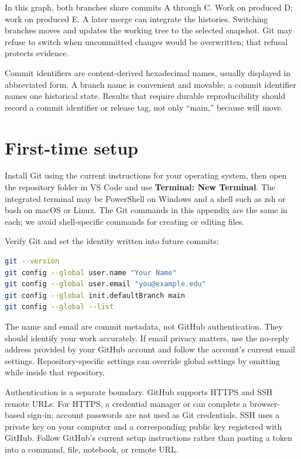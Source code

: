 In this graph, both branches share commits A through C. Work on 
produced D; work on  produced E. A later merge can integrate the
histories. Switching branches moves  and updates the working tree to
the selected snapshot. Git may refuse to switch when uncommitted changes would
be overwritten; that refusal protects evidence.

Commit identifiers are content-derived hexadecimal names, usually displayed in
abbreviated form. A branch name is convenient and movable; a commit identifier
names one historical state. Results that require durable reproducibility should
record a commit identifier or release tag, not only ``main,'' because
 will move.

\section{First-time setup}

Install Git using the current instructions for your operating system, then open
the repository folder in VS Code and use \textbf{Terminal: New Terminal}. The
integrated terminal may be PowerShell on Windows and a shell such as zsh or bash
on macOS or Linux. The Git commands in this appendix are the same in each; we
avoid shell-specific commands for creating or editing files.

Verify Git and set the identity written into future commits:

\begin{lstlisting}[language=bash,numbers=none]
git --version
git config --global user.name "Your Name"
git config --global user.email "you@example.edu"
git config --global init.defaultBranch main
git config --global --list
\end{lstlisting}

The name and email are commit metadata, not GitHub authentication. They should
identify your work accurately. If email privacy matters, use the no-reply address
provided by your GitHub account and follow the account's current email settings.
Repository-specific settings can override global settings by omitting
 while inside that repository.

Authentication is a separate boundary. GitHub supports HTTPS and SSH remote
URLs. For HTTPS, a credential manager or  can complete a
browser-based sign-in; account passwords are not used as Git credentials. SSH
uses a private key on your computer and a corresponding public key registered
with GitHub. Follow GitHub's current setup instructions rather than pasting a
token into a command, file, notebook, or remote URL.

